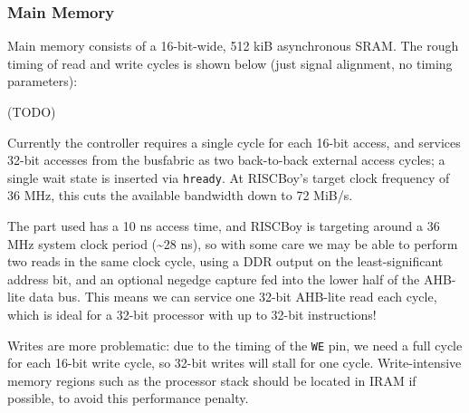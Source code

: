 \subsubsection{Main Memory}

Main memory consists of a 16-bit-wide, 512 kiB asynchronous SRAM. The rough timing of read and write cycles is shown below (just signal alignment, no timing parameters):

(TODO)

Currently the controller requires a single cycle for each 16-bit access, and services 32-bit accesses from the busfabric as two back-to-back external access cycles; a single wait state is inserted via {\tt hready}. At RISCBoy's target clock frequency of 36 MHz, this cuts the available bandwidth down to 72 MiB/s.

The part used has a 10 ns access time, and RISCBoy is targeting around a 36 MHz system clock period (\textasciitilde 28 ns), so with some care we may be able to perform two reads in the same clock cycle, using a DDR output on the least-significant address bit, and an optional negedge capture fed into the lower half of the AHB-lite data bus. This means we can service one 32-bit AHB-lite read each cycle, which is ideal for a 32-bit processor with up to 32-bit instructions!

Writes are more problematic: due to the timing of the {\tt WE} pin, we need a full cycle for each 16-bit write cycle, so 32-bit writes will stall for one cycle. Write-intensive memory regions such as the processor stack should be located in IRAM if possible, to avoid this performance penalty.

